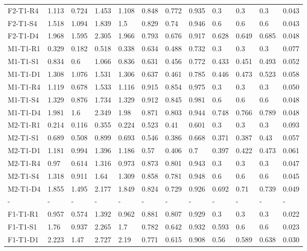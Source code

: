 \begin{table}[ht]
\begin{tabular}{llllllllllll}
  F2-T1-R4 & 1.113 & 0.724 & 1.453 & 1.108 & 0.848 & 0.772 & 0.935 & 0.3 & 0.3 & 0.3 &    0.043  \\ 
  F2-T1-S4 & 1.518 & 1.094 & 1.839 & 1.5 & 0.829 & 0.74 & 0.946 & 0.6 & 0.6 & 0.6 &    0.043  \\ 
  F2-T1-D4 & 1.968 & 1.595 & 2.305 & 1.966 & 0.793 & 0.676 & 0.917 & 0.628 & 0.649 & 0.685 &    0.048  \\ 
  M1-T1-R1 & 0.329 & 0.182 & 0.518 & 0.338 & 0.634 & 0.488 & 0.732 & 0.3 & 0.3 & 0.3 &    0.077  \\ 
  M1-T1-S1 & 0.834 & 0.6 & 1.066 & 0.836 & 0.631 & 0.456 & 0.772 & 0.433 & 0.451 & 0.493 &    0.052  \\ 
  M1-T1-D1 & 1.308 & 1.076 & 1.531 & 1.306 & 0.637 & 0.461 & 0.785 & 0.446 & 0.473 & 0.523 &    0.058  \\ 
  M1-T1-R4 & 1.119 & 0.678 & 1.533 & 1.116 & 0.915 & 0.854 & 0.975 & 0.3 & 0.3 & 0.3 &    0.050  \\ 
  M1-T1-S4 & 1.329 & 0.876 & 1.734 & 1.329 & 0.912 & 0.845 & 0.981 & 0.6 & 0.6 & 0.6 &    0.048  \\ 
  M1-T1-D4 & 1.981 & 1.6 & 2.349 & 1.98 & 0.871 & 0.803 & 0.944 & 0.748 & 0.766 & 0.789 &    0.048  \\ 
  M2-T1-R1 & 0.214 & 0.116 & 0.355 & 0.224 & 0.523 & 0.41 & 0.601 & 0.3 & 0.3 & 0.3 &    0.093  \\ 
  M2-T1-S1 & 0.689 & 0.508 & 0.899 & 0.693 & 0.546 & 0.386 & 0.668 & 0.371 & 0.387 & 0.43 &    0.057  \\ 
  M2-T1-D1 & 1.181 & 0.994 & 1.396 & 1.186 & 0.57 & 0.406 & 0.7 & 0.397 & 0.422 & 0.473 &    0.061  \\ 
  M2-T1-R4 & 0.97 & 0.614 & 1.316 & 0.973 & 0.873 & 0.801 & 0.943 & 0.3 & 0.3 & 0.3 &    0.047  \\ 
  M2-T1-S4 & 1.318 & 0.911 & 1.64 & 1.309 & 0.858 & 0.781 & 0.948 & 0.6 & 0.6 & 0.6 &    0.045  \\ 
  M2-T1-D4 & 1.855 & 1.495 & 2.177 & 1.849 & 0.824 & 0.729 & 0.926 & 0.692 & 0.71 & 0.739 &    0.049  \\ 
  - & - & - & - & - & - & - & - & - & - & - & - \\ 
  F1-T1-R1 & 0.957 & 0.574 & 1.392 & 0.962 & 0.881 & 0.807 & 0.929 & 0.3 & 0.3 & 0.3 &    0.022  \\ 
  F1-T1-S1 & 1.76 & 0.937 & 2.265 & 1.7 & 0.782 & 0.642 & 0.932 & 0.593 & 0.6 & 0.6 &    0.023  \\ 
  F1-T1-D1 & 2.223 & 1.47 & 2.727 & 2.19 & 0.771 & 0.615 & 0.908 & 0.56 & 0.589 & 0.638 &    0.030  \\ 

\end{tabular}
\end{table}
